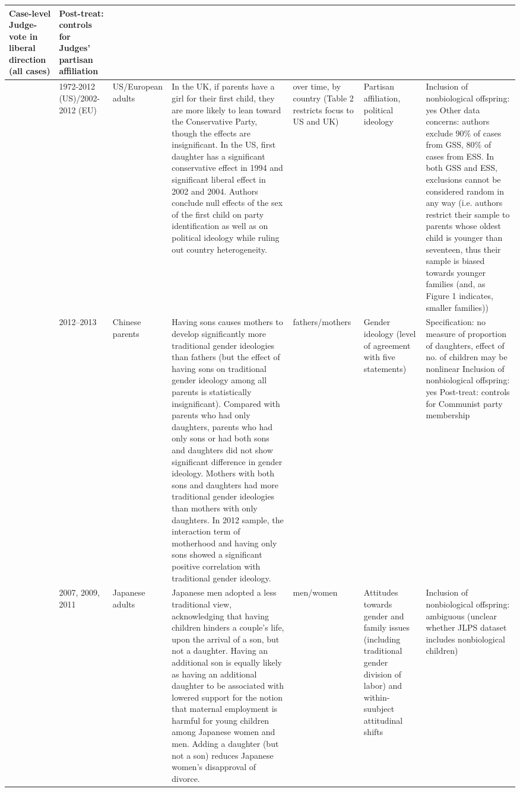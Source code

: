 \begin{longtable}{p{}p{}p{}p{}p{}p{}p{}}
Case-level Judge-vote in liberal direction (all cases) & Post-treat: controls for Judges' partisan affiliation \\ 
   \midrule
\cite{lee2016does} & 1972-2012 (US)/2002-2012 (EU) & US/European adults & In the UK, if parents have a girl for their first child, they are more likely to lean toward the Conservative Party, though the effects are insignificant.  In the US, first daughter has a significant conservative effect in 1994 and significant liberal effect in 2002 and 2004.  Authors conclude null effects of the sex of the first child on party identification as well as on political ideology while ruling out country heterogeneity. & over time, by country (Table 2 restricts focus to US and UK) & Partisan affiliation, political ideology & Inclusion of nonbiological offspring: yes
Other data concerns: authors exclude 90\% of cases from GSS, 80\% of cases from ESS. In both GSS and ESS, exclusions cannot be considered random in any way (i.e. authors restrict their sample to parents whose oldest child is younger than seventeen, thus their sample is biased towards younger families (and, as Figure 1 indicates, smaller families)) \\ 
   \midrule
\cite{sun2017mothers} & 2012--2013 & Chinese parents & Having sons causes mothers to develop significantly more traditional gender ideologies than fathers (but the effect of having sons on traditional gender ideology among all parents is statistically insignificant). Compared with parents who had only daughters, parents who had only sons or had both sons and daughters did not show significant difference in gender ideology. Mothers with both sons and daughters had more traditional gender ideologies than mothers with only daughters. In 2012 sample, the interaction term of motherhood and having only sons showed a significant positive correlation with traditional gender ideology. & fathers/mothers & Gender ideology (level of agreement with five statements) & Specification: no measure of proportion of daughters, effect of no. of children may be nonlinear
Inclusion of nonbiological offspring: yes
Post-treat: controls for Communist party membership \\ 
   \midrule
\cite{yu2018does} & 2007, 2009, 2011 & Japanese adults & Japanese men adopted a less traditional view, acknowledging that having children hinders a couple’s life, upon the arrival of a son, but not a daughter. Having an additional son is equally likely as having an additional daughter to be associated with lowered support for the notion that maternal employment is harmful for young children among Japanese women and men. Adding a daughter (but not a son) reduces Japanese women’s disapproval of divorce. & men/women & Attitudes towards gender and family issues (including traditional gender division of labor) and within-suubject attitudinal shifts & Inclusion of nonbiological offspring: ambiguous (unclear whether JLPS dataset includes nonbiological children) \\ 

\end{longtable}
